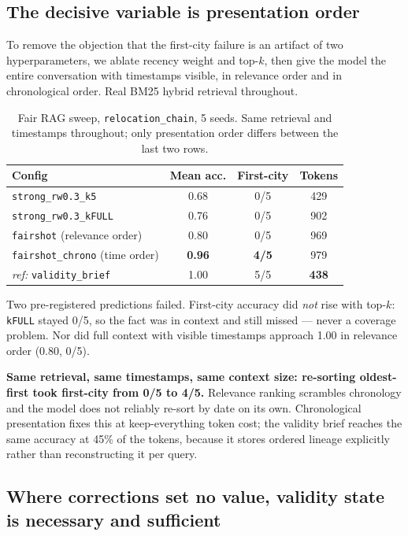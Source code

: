 \documentclass{article}
\begin{document}
\subsection{The decisive variable is presentation order}
\label{sec:order}

To remove the objection that the first-city failure is an artifact of two hyperparameters, we ablate recency weight and top-$k$, then give the model the entire conversation with timestamps visible, in relevance order and in chronological order. Real BM25 hybrid retrieval throughout.

\begin{table}[t]
\centering\footnotesize
\caption{Fair RAG sweep, \texttt{relocation\_chain}, 5 seeds. Same retrieval and timestamps throughout; only presentation order differs between the last two rows.}
\label{tab:sweep}
\begin{tabular}{lccc}
\toprule
Config & Mean acc. & First-city & Tokens \\
\midrule
\texttt{strong\_rw0.3\_k5}    & 0.68 & 0/5 & 429 \\
\texttt{strong\_rw0.3\_kFULL} & 0.76 & 0/5 & 902 \\
\texttt{fairshot} (relevance order) & 0.80 & 0/5 & 969 \\
\texttt{fairshot\_chrono} (time order) & \textbf{0.96} & \textbf{4/5} & 979 \\
\midrule
\emph{ref:} \texttt{validity\_brief} & 1.00 & 5/5 & \textbf{438} \\
\bottomrule
\end{tabular}
\end{table}

Two pre-registered predictions failed. First-city accuracy did \emph{not} rise with top-$k$: \texttt{kFULL} stayed 0/5, so the fact was in context and still missed --- never a coverage problem. Nor did full context with visible timestamps approach 1.00 in relevance order (0.80, 0/5).

\textbf{Same retrieval, same timestamps, same context size: re-sorting oldest-first took first-city from 0/5 to 4/5.} Relevance ranking scrambles chronology and the model does not reliably re-sort by date on its own. Chronological presentation fixes this at keep-everything token cost; the validity brief reaches the same accuracy at 45\% of the tokens, because it stores ordered lineage explicitly rather than reconstructing it per query.

\subsection{Where corrections set no value, validity state is necessary and sufficient}
\label{sec:hard}
\end{document}
